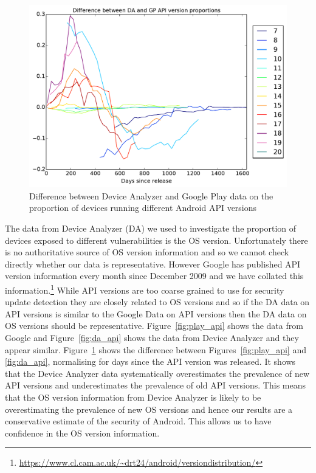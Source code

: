\documentclass[conference,a4paper,twoside]{IEEEtran}
\begin{document}
\begin{figure}
 \centering
 \includegraphics[width=\columnwidth]{figures/api_gpcomp_rdiff}
 \caption{Difference between Device Analyzer and Google Play data on the proportion of devices running different Android API versions}
 \label{fig:da_gp_comp_diff}
\end{figure}
The data from Device Analyzer (DA) we used to investigate the proportion of devices exposed to different vulnerabilities is the OS version.
Unfortunately there is no authoritative source of OS version information and so we cannot check directly whether our data is representative.
However Google has published API version information every month since December 2009 and we have collated this information.\footnote{\url{https://www.cl.cam.ac.uk/~drt24/android/versiondistribution/}}
While API versions are too coarse grained to use for security update detection they are closely related to OS versions and so if the DA data on API versions is similar to the Google Data on API versions then the DA data on OS versions should be representative.
Figure~\ref{fig:play_api} shows the data from Google and Figure~\ref{fig:da_api} shows the data from Device Analyzer and they appear similar.
Figure~\ref{fig:da_gp_comp_diff} shows the difference between Figures~\ref{fig:play_api} and \ref{fig:da_api}, normalising for days since the API version was released.
It shows that the Device Analyzer data systematically overestimates the prevalence of new API versions and underestimates the prevalence of old API versions.
This means that the OS version information from Device Analyzer is likely to be overestimating the prevalence of new OS versions and hence our results are a conservative estimate of the security of Android.
This allows us to have confidence in the OS version information.
\end{document}
